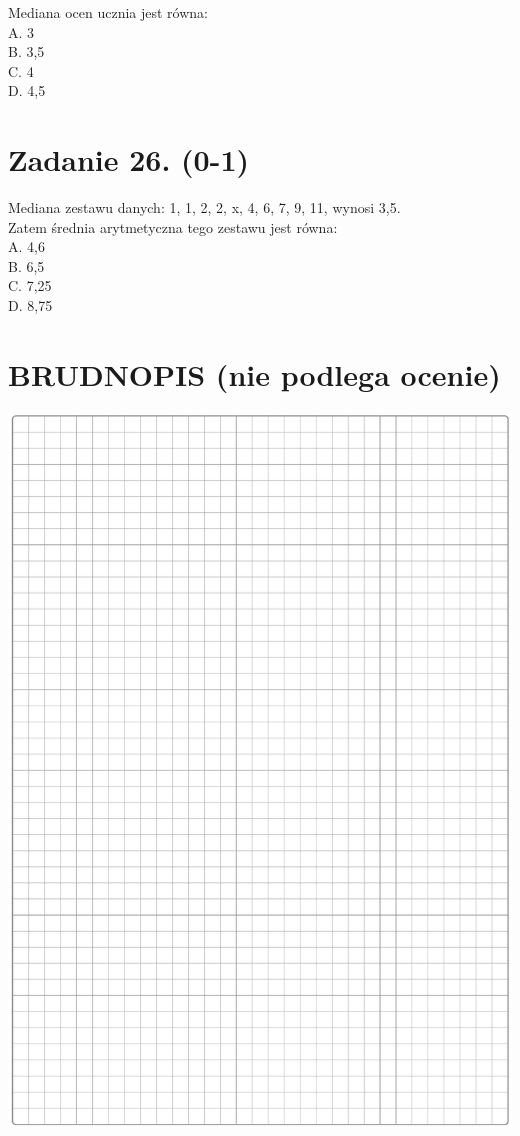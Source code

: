 \documentclass[10pt]{article}
\begin{document}
Mediana ocen ucznia jest równa:\\
A. 3\\
B. 3,5\\
C. 4\\
D. 4,5

\section*{Zadanie 26. (0-1)}
Mediana zestawu danych: 1, 1, 2, 2, x, 4, 6, 7, 9, 11, wynosi 3,5.\\
Zatem średnia arytmetyczna tego zestawu jest równa:\\
A. 4,6\\
B. 6,5\\
C. 7,25\\
D. 8,75

\section*{BRUDNOPIS (nie podlega ocenie)}
\begin{center}
\includegraphics[max width=\textwidth]{2024_11_21_cdea326d19d0c2132b88g-09}
\end{center}
\end{document}
